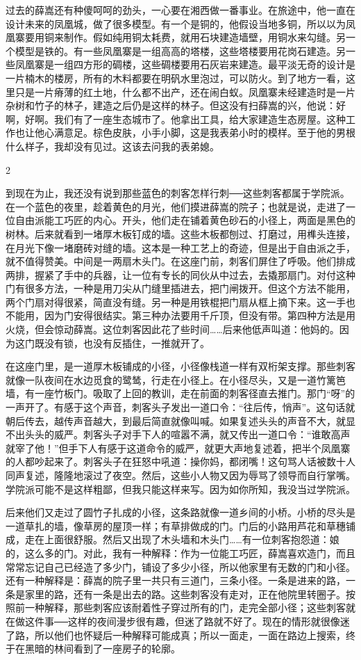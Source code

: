 过去的薛嵩还有种傻呵呵的劲头，一心要在湘西做一番事业。在旅途中，他一直在设计未来的凤凰城，做了很多模型。有一个是铜的，他假设当地多铜，所以以为凤凰寨要用铜来制作。假如纯用铜太耗费，就用石块建造墙壁，用铜水来勾缝。另一个模型是铁的。有一些凤凰寨是一组高高的塔楼，这些塔楼要用花岗石建造。另一些凤凰寨是一组四方形的碉楼，这些碉楼要用石灰岩来建造。最平淡无奇的设计是一片楠木的楼房，所有的木料都要在明矾水里泡过，可以防火。到了地方一看，这里只是一片瘠薄的红土地，什么都不出产，还在闹白蚁。凤凰寨未经建造时是一片杂树和竹子的林子，建造之后仍是这样的林子。但这没有扫薛嵩的兴，他说：好啊，好啊。我们有了一座生态城市了。他拿出工具，给大家建造生态房屋。这种工作也让他心满意足。棕色皮肤，小手小脚，这是我表弟小时的模样。至于他的男根什么样子，我却没有见过。这该去问我的表弟媳。 

2 

到现在为止，我还没有说到那些蓝色的刺客怎样行刺──这些刺客都属于学院派。在一个蓝色的夜里，趁着黄色的月光，他们摸进薛嵩的院子；也就是说，走进了一位自由派能工巧匠的内心。开头，他们走在铺着黄色砂石的小径上，两面是黑色的树林。后来就看到一堵厚木板钉成的墙。这些木板都刨过、打磨过，用榫头连接，在月光下像一堵磨砖对缝的墙。这本是一种工艺上的奇迹，但是出于自由派之手，就不值得赞美。中间是一两扇木头门。在这座门前，刺客们屏住了呼吸。他们排成两排，握紧了手中的兵器，让一位有专长的同伙从中过去，去撬那扇门。对付这种门有很多方法，一种是用刀尖从门缝里插进去，把门闸拨开。但这个方法不能用，两个门扇对得很紧，简直没有缝。另一种是用铁棍把门扇从框上摘下来。这一手也不能用，因为门安得很结实。第三种办法要用千斤顶，但没有带。第四种方法是用火烧，但会惊动薛嵩。这位刺客因此花了些时间……后来他低声叫道：他妈的。因为这门既没有锁，也没有反插住，一推就开了。 

在这座门里，是一道厚木板铺成的小径，小径像栈道一样有双桁架支撑。那些刺客就像一队夜间在水边觅食的鹭鸶，行走在小径上。在小径尽头，又是一道竹篱笆墙，有一座竹板门。吸取了上回的教训，走在前面的刺客径直去推门。那门“呀”的一声开了。有感于这个声音，刺客头子发出一道口令：“往后传，悄声”。这句话就朝后传去，越传声音越大，到最后简直就像叫喊。如果复述头头的声音不大，就显不出头头的威严。刺客头子对手下人的喧嚣不满，就又传出一道口令：“谁敢高声就宰了他！”但手下人有感于这道命令的威严，就更大声地复述着，把半个凤凰寨的人都吵起来了。刺客头子在狂怒中吼道：操你妈，都闭嘴！这句骂人话被数十人同声复述，隆隆地滚过了夜空。然后，这些小人物又因为辱骂了领导而自行掌嘴。学院派可能不是这样粗鄙，但我只能这样来写。因为如你所知，我没当过学院派。 

后来他们又走过了圆竹子扎成的小径，这条路就像一道乡间的小桥。小桥的尽头是一道草扎的墙，像草房的屋顶一样；有草排做成的门。门后的小路用芦花和草穗铺成，走在上面很舒服。然后又出现了木头墙和木头门……有一位刺客抱怨道：娘的，这么多的门。对此，我有一种解释：作为一位能工巧匠，薛嵩喜欢造门，而且常常忘记自己已经造了多少门，铺设了多少小径，所以他家里有无数的门和小径。还有一种解释是：薛嵩的院子里一共只有三道门，三条小径。一条是进来的路，一条是家里的路，还有一条是出去的路。这些刺客没有走对，正在他院里转圈子。按照前一种解释，那些刺客应该耐着性子穿过所有的门，走完全部小径；这些刺客就在做这件事──这样的夜间漫步很有趣，但迷了路就不好了。现在的情形就很像迷了路，所以他们也怀疑后一种解释可能成真；所以一面走，一面在路边上搜索，终于在黑暗的林间看到了一座房子的轮廓。 

